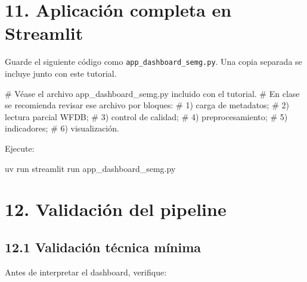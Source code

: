 \documentclass[
  spanish,
  a4paper,
  DIV=11,
  numbers=noendperiod]{scrreprt}
\newenvironment{Shaded}{\begin{snugshade}}{\end{snugshade}}
\newcommand{\CommentTok}[1]{\textcolor[rgb]{0.37,0.37,0.37}{#1}}
\newcommand{\ExtensionTok}[1]{\textcolor[rgb]{0.00,0.23,0.31}{#1}}
\newcommand{\NormalTok}[1]{\textcolor[rgb]{0.00,0.23,0.31}{#1}}
\begin{document}
\chapter{11. Aplicación completa en
Streamlit}\label{aplicaciuxf3n-completa-en-streamlit}

Guarde el siguiente código como \texttt{app\_dashboard\_semg.py}. Una
copia separada se incluye junto con este tutorial.

\begin{Shaded}
\begin{Highlighting}[]
\CommentTok{\# Véase el archivo app\_dashboard\_semg.py incluido con el tutorial.}
\CommentTok{\# En clase se recomienda revisar ese archivo por bloques:}
\CommentTok{\# 1) carga de metadatos;}
\CommentTok{\# 2) lectura parcial WFDB;}
\CommentTok{\# 3) control de calidad;}
\CommentTok{\# 4) preprocesamiento;}
\CommentTok{\# 5) indicadores;}
\CommentTok{\# 6) visualización.}
\end{Highlighting}
\end{Shaded}

Ejecute:

\begin{Shaded}
\begin{Highlighting}[]
\ExtensionTok{uv}\NormalTok{ run streamlit run app\_dashboard\_semg.py}
\end{Highlighting}
\end{Shaded}

\chapter{12. Validación del pipeline}\label{validaciuxf3n-del-pipeline}

\section{12.1 Validación técnica
mínima}\label{validaciuxf3n-tuxe9cnica-muxednima}

Antes de interpretar el dashboard, verifique:
\end{document}
